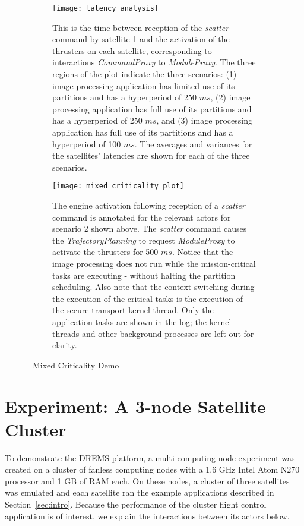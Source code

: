 \begin{figure*}[!htb]
\begin{subfigure}[b]{0.9\textwidth}
\centering
\texttt{[image: latency\_analysis]}
\caption{
This is the time between reception of the \emph{scatter} command by satellite 1 and the activation of the thrusters on each satellite, corresponding to interactions \textit{CommandProxy} to \textit{ModuleProxy}. The three regions of the plot indicate the three scenarios: (1) image processing application has limited use of its partitions and has a hyperperiod of 250 $ms$, (2) image processing application has full use of its partitions and has a hyperperiod of 250 $ms$, and (3) image processing application has full use of its partitions and has a hyperperiod of 100 $ms$.  The averages and variances for the satellites' latencies are shown for each of the three scenarios.}
\label{fig:latency_analysis}
\end{subfigure}
\begin{subfigure}[b]{0.9\textwidth}
\centering
\texttt{[image: mixed\_criticality\_plot]}
\caption{The engine activation following reception of a \emph{scatter} command is annotated for the relevant actors for scenario 2 shown above. The \emph{scatter} command causes the \emph{TrajectoryPlanning} to request \emph{ModuleProxy} to activate the thrusters for 500 $ms$. Notice that the image processing does not run while the mission-critical tasks are executing - without halting the partition scheduling.  Also note that the context switching during the execution of the critical tasks is the execution of the secure transport kernel thread. Only the application tasks are shown in the log; the kernel threads and other background processes are left out for clarity.}
\label{fig:orbiter_plot}
\end{subfigure}
\vspace{-0.1in}
\caption{\iap\ Mixed Criticality Demo }
\vspace{-0.2in}
\end{figure*}

\section{Experiment: A 3-node Satellite Cluster}
\label{sec:experiment}

To demonstrate the DREMS platform, a multi-computing node experiment was created on a cluster of fanless computing nodes with a 1.6 GHz Intel Atom N270 processor and 1 GB of RAM each. 
On these nodes, a cluster of three satellites was emulated and each satellite ran the example applications described in Section~\ref{sec:intro}. 
  Because the performance of the cluster flight control application is of interest, we explain the interactions between its actors below.  

